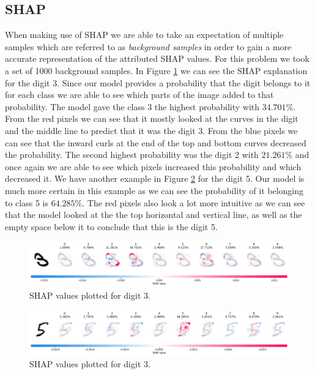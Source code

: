 \subsection{SHAP}
When making use of SHAP we are able to take an expectation of multiple samples which are referred to as \emph{background samples} in order to gain a more accurate representation of the attributed SHAP values. For this problem we took a set of 1000 background samples. In Figure \ref{fig:shap-mnist-3} we can see the SHAP explanation for the digit 3. Since our model provides a probability that the digit belongs to it for each class we are able to see which parts of the image added to that probability. The model gave the class 3 the highest probability with $34.701\%$. From the red pixels we can see that it mostly looked at the curves in the digit and the middle line to predict that it was the digit 3. From the blue pixels we can see that the inward curls at the end of the top and bottom curves decreased the probability. The second highest probability was the digit 2 with $21.261\%$ and once again we are able to see which pixels increased this probability and which decreased it. We have another example in Figure \ref{fig:shap-mnist-5} for the digit 5. Our model is much more certain in this example as we can see the probability of it belonging to class 5 is $64.285\%$. The red pixels also look a lot more intuitive as we can see that the model looked at the the top horizontal and vertical line, as well as the empty space below it to conclude that this is the digit 5.
\begin  {figure}[!htpb]
  \includegraphics[width=\linewidth]{Evaluation_Images/shap_digit_3.png}
  \caption{SHAP values plotted for digit 3.}
  \label{fig:shap-mnist-3}
\end{figure}
\begin  {figure}[!htpb]
  \includegraphics[width=\linewidth]{Evaluation_Images/shap_digit_5.png}
  \caption{SHAP values plotted for digit 3.}
  \label{fig:shap-mnist-5}
\end{figure}

